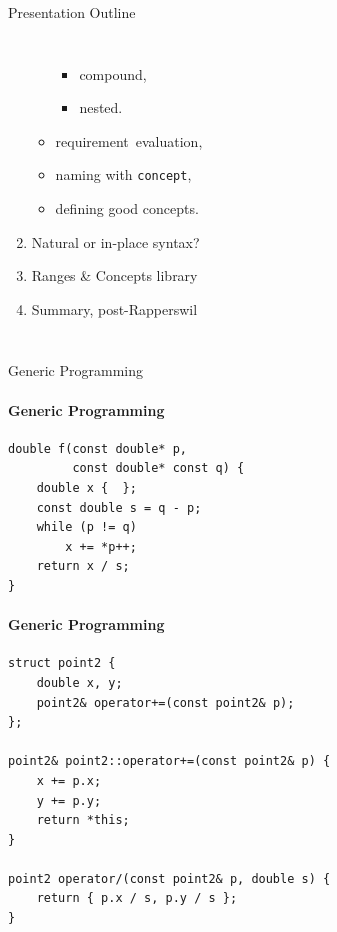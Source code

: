 \documentclass{beamer}
\begin{document}
\begin{frame}[fragile]{Presentation Outline}
\begin{columns}
\begin{enumerate}
\begin{itemize}
\begin{itemize}
                        \item compound,
                        \item nested.
                    \end{itemize}
                    \item requirement\, evaluation,
                    \item naming with \texttt{concept},
                    \item defining good concepts.
                \end{itemize}
                \item Natural or in-place syntax?
                \item Ranges \& Concepts library
                \item Summary, post-Rapperswil
            \end{enumerate}
        \end{columns}
    \end{frame}

    \begin{frame}[fragile]{Generic Programming}
    \end{frame}

    \begin{frame}[fragile]{}
        \framesubtitle{Generic Programming}
        \begin{center}
        \begin{lstlisting}[caption={a ``mysterious'' function; can you figure out what this code is?}]
double f(const double* p,
         const double* const q) {
    double x {  };
    const double s = q - p;
    while (p != q)
        x += *p++;
    return x / s;
} \end{lstlisting}
        \end{center}
    \end{frame}

    \begin{frame}[fragile]{}
        \framesubtitle{Generic Programming}
        \begin{center}
        \begin{lstlisting}[caption={boilerplate for the next example; a very incomplete point class.}]
struct point2 {
    double x, y;
    point2& operator+=(const point2& p);
};

point2& point2::operator+=(const point2& p) {
    x += p.x;
    y += p.y;
    return *this;
}

point2 operator/(const point2& p, double s) {
    return { p.x / s, p.y / s };
} \end{lstlisting}
        \end{center}
    \end{frame}
\end{document}
